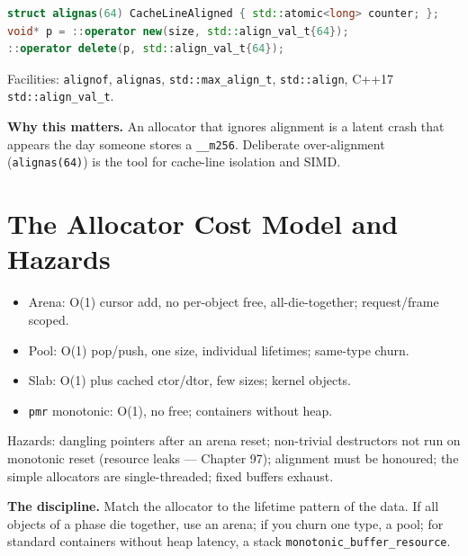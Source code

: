 \begin{lstlisting}[language=C++, caption={Over-alignment and C++17 aligned new. Min standard: C++17.}]
struct alignas(64) CacheLineAligned { std::atomic<long> counter; };
void* p = ::operator new(size, std::align_val_t{64});
::operator delete(p, std::align_val_t{64});
\end{lstlisting}

Facilities: \texttt{alignof}, \texttt{alignas}, \texttt{std::max\_align\_t}, \texttt{std::align}, C++17 \texttt{std::align\_val\_t}.

\textbf{Why this matters.} An allocator that ignores alignment is a latent crash that appears the day someone stores a \texttt{\_\_m256}. Deliberate over-alignment (\texttt{alignas(64)}) is the tool for cache-line isolation and SIMD.

\section{The Allocator Cost Model and Hazards}
\begin{itemize}
\item Arena: O(1) cursor add, no per-object free, all-die-together; request/frame scoped.
\item Pool: O(1) pop/push, one size, individual lifetimes; same-type churn.
\item Slab: O(1) plus cached ctor/dtor, few sizes; kernel objects.
\item \texttt{pmr} monotonic: O(1), no free; containers without heap.
\end{itemize}

Hazards: dangling pointers after an arena reset; non-trivial destructors not run on monotonic reset (resource leaks --- Chapter 97); alignment must be honoured; the simple allocators are single-threaded; fixed buffers exhaust.

\textbf{The discipline.} Match the allocator to the lifetime pattern of the data. If all objects of a phase die together, use an arena; if you churn one type, a pool; for standard containers without heap latency, a stack \texttt{monotonic\_buffer\_resource}.
